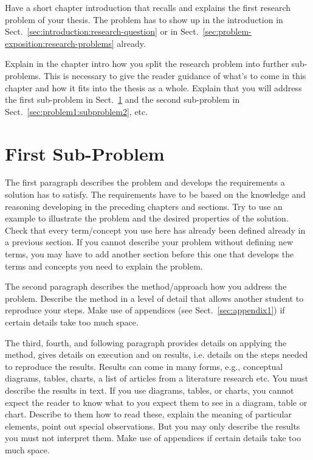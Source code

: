 \documentclass[12pt,a4paper,footinclude=true,twoside,headinclude=true]{report}
\begin{document}
Have a short chapter introduction that recalls and explains the first research problem of your thesis. The problem has to show up in the introduction in Sect.~\ref{sec:introduction:research-question} or in Sect.~\ref{sec:problem-exposition:research-problems} already. 

Explain in the chapter intro how you split the research problem into further sub-problems. This is necessary to give the reader guidance of what's to come in this chapter and how it fits into the thesis as a whole. Explain that you will address the first sub-problem in Sect.~\ref{sec:problem1:subproblem1} and the second sub-problem in Sect.~\ref{sec:problem1:subproblem2}, etc.

\section{First Sub-Problem}\label{sec:problem1:subproblem1}

\textsf{The first paragraph describes the problem and develops the requirements a solution has to satisfy.} The requirements have to be based on the knowledge and reasoning developing in the preceding chapters and sections. Try to use an example to illustrate the problem and the desired properties of the solution. Check that every term/concept you use here has already been defined already in a previous section. If you cannot describe your problem without defining new terms, you may have to add another section before this one that develops the terms and concepts you need to explain the problem.

\textsf{The second paragraph describes the method/approach how you address the problem.} Describe the method in a level of detail that allows another student to reproduce your steps. Make use of appendices (see Sect.~\ref{sec:appendix1}) if certain details take too much space.

\textsf{The third, fourth, and following paragraph provides details on applying the method, gives details on execution and on results}, i.e. details on the steps needed to reproduce the results. Results can come in many forms, e.g., conceptual diagrams, tables, charts, a list of articles from a literature research etc. You must describe the results in text. If you use diagrams, tables, or charts, you cannot expect the reader to know what to you expect them to see in a diagram, table or chart. Describe to them how to read these, explain the meaning of particular elements, point out special observations. But you may only describe the results you must not interpret them. Make use of appendices if certain details take too much space.
\end{document}
